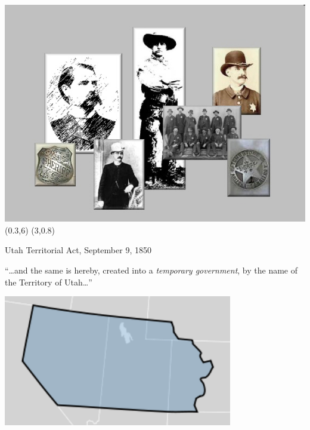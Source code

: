 \unitlength=1in
\begin{frame}
    \centering
    \includegraphics[width=.9\textwidth]{img/sheriffs.png} \\
    \pause
    \Put(0.3,6){\textbf{}}
    \pause
    \Put(3,0.8){\textbf{}}
\end{frame}

\begin{frame}{Utah Territorial Act, September 9, 1850}
    \centering
    \begin{block}{}
        ``\ldots and the same is hereby, created into a \emph{temporary government}, by the name of the Territory of Utah\ldots''
    \end{block}
    \vspace{10pt}
    \includegraphics[width=0.75\textwidth]{img/utah-terr.png} \\
\end{frame}


